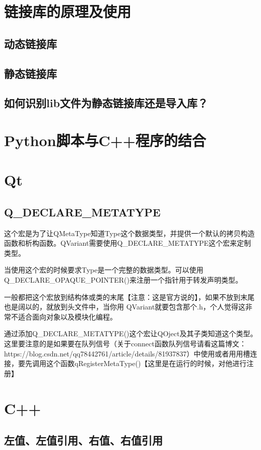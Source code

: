 \section{链接库的原理及使用}
\subsection{动态链接库}
\subsection{静态链接库}
\subsection{如何识别lib文件为静态链接库还是导入库？}
\section{Python脚本与C++程序的结合}

\section{Qt}
\subsection{Q\_DECLARE\_METATYPE}
这个宏是为了让QMetaType知道Type这个数据类型，并提供一个默认的拷贝构造函数和析构函数。QVariant需要使用Q\_DECLARE\_METATYPE这个宏来定制类型。

当使用这个宏的时候要求Type是一个完整的数据类型。可以使用Q\_DECLARE\_OPAQUE\_POINTER()来注册一个指针用于转发声明类型。

一般都把这个宏放到结构体或类的末尾【注意：这是官方说的】，如果不放到末尾也是阔以的，就放到头文件中，当你用 QVariant就要包含那个.h，个人觉得这非常不适合面向对象以及模块化编程。

通过添加Q\_DECLARE\_METATYPE()这个宏让QOject及其子类知道这个类型。这里要注意的是如果要在队列信号（关于connect函数队列信号请看这篇博文：https://blog.csdn.net/qq78442761/article/details/81937837）中使用或者用用槽连接，要先调用这个函数qRegisterMetaType()【这里是在运行的时候，对他进行注册】

\section{C++}
\subsection{左值、左值引用、右值、右值引用}
